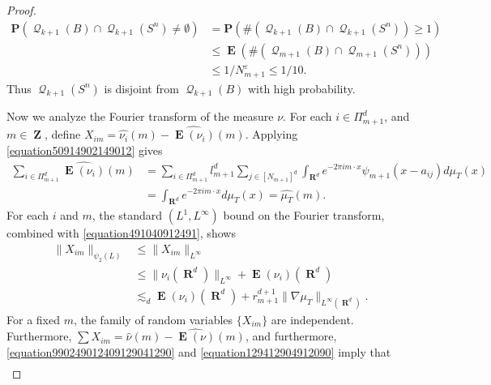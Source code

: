 \documentclass[12pt,reqno]{amsart}
\DeclareMathOperator{\RR}{\mathbf{R}}
\DeclareMathOperator{\ZZ}{\mathbf{Z}}
\DeclareMathOperator{\EE}{\mathbf{E}}
\DeclareMathOperator{\DQ}{\mathcal{Q}}
\newcommand{\psitwo}[1]{\| {#1} \|_{\psi_2(L)}}
\begin{document}
\begin{proof}
    \begin{equation} \label{fourierdim2}
    \begin{split}
        \mathbf{P}(\DQ_{k+1}(B) \cap \DQ_{k+1}(S^n) \neq \emptyset) &= \mathbf{P}(\# (\DQ_{k+1}(B) \cap \DQ_{k+1}(S^n)) \geq 1)\\
        &\leq \EE(\#(\DQ_{m+1}(B) \cap \DQ_{m+1}(S^n)))\\
        &\leq 1/N_{m+1}^\varepsilon \leq 1/10.
    \end{split}
    \end{equation}
    Thus $\DQ_{k+1}(S^n)$ is disjoint from $\DQ_{k+1}(B)$ with high probability.

    Now we analyze the Fourier transform of the measure $\nu$. For each $i \in \Pi_{m+1}^d$, and $m \in \ZZ$, define $X_{im} = \widehat{\nu_i}(m) - \widehat{\EE(\nu_i)}(m)$. Applying \eqref{equation50914902149012} gives 
    \begin{equation} \label{equation891248921894128942189}
    \begin{split}
        \sum_{i \in \Pi_{m+1}^d} \widehat{\EE(\nu_i)}(m) &= \sum_{i \in \Pi_{m+1}^d} l_{m+1}^d \sum_{j \in [N_{m+1}]^d} \int_{\RR^d} e^{- 2 \pi i m \cdot x} \psi_{m+1}(x - a_{ij}) d\mu_T(x)\\
        &= \int_{\RR^d} e^{-2 \pi i m \cdot x} d\mu_T(x) = \widehat{\mu_T}(m).
    \end{split}
    \end{equation}
    For each $i$ and $m$, the standard $(L^1,L^\infty)$ bound on the Fourier transform, combined with \eqref{equation491040912491}, shows
    \begin{equation} \label{equation12904912049012}
    \begin{split}
        \psitwo{X_{im}} &\leq \| X_{im} \|_{L^\infty}\\
        &\leq \| \nu_i(\RR^d) \|_{L^\infty} + \EE(\nu_i)(\RR^d)\\
        &\lesssim_d \EE(\nu_i)(\RR^d) + r_{m+1}^{d+1} \| \nabla \mu_T \|_{L^\infty(\RR^d)}.
    \end{split}
    \end{equation}
    For a fixed $m$, the family of random variables $\{ X_{im} \}$ are independent. Furthermore, $\sum X_{im} = \widehat{\nu}(m) - \widehat{\EE(\nu)}(m)$, and furthermore, \eqref{equation990249012409129041290} and \eqref{equation129412904912090} imply that
    \begin{equation} \label{equation19241902490129021}
    \begin{split}

\end{split}
\end{equation}
\end{proof}
\end{document}
